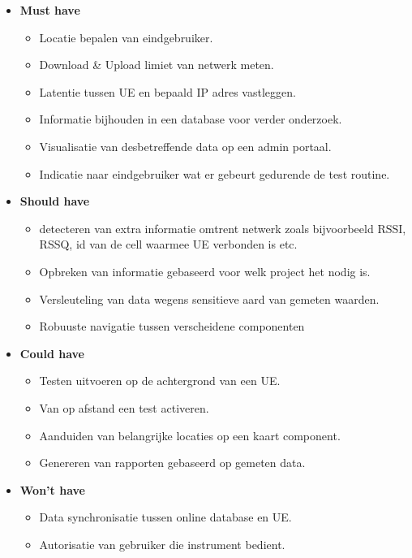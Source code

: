 \begin{itemize}
    \item \textbf{Must have}
    \begin{itemize}
        \item Locatie bepalen van eindgebruiker.
        \item Download \& Upload limiet van netwerk meten.
        \item Latentie tussen UE en bepaald IP adres vastleggen.
        \item Informatie bijhouden in een database voor verder onderzoek.
        \item Visualisatie van desbetreffende data op een admin portaal.
        \item Indicatie naar eindgebruiker wat er gebeurt gedurende de test routine.
    \end{itemize}
    \item \textbf{Should have}
    \begin{itemize}
        \item detecteren van extra informatie omtrent netwerk zoals bijvoorbeeld RSSI, RSSQ, id van de cell waarmee UE verbonden is etc.
        \item Opbreken van informatie gebaseerd voor welk project het nodig is.
        \item Versleuteling van data wegens sensitieve aard van gemeten waarden.
        \item Robuuste navigatie tussen verscheidene componenten
    \end{itemize}
    \item \textbf{Could have}
    \begin{itemize}
        \item Testen uitvoeren op de achtergrond van een UE.
        \item Van op afstand een test activeren.
        \item Aanduiden van belangrijke locaties op een kaart component.
        \item Genereren van rapporten gebaseerd op gemeten data.
    \end{itemize}
    \item \textbf{Won't have}
    \begin{itemize}
        \item Data synchronisatie tussen online database en UE.
        \item Autorisatie van gebruiker die instrument bedient.
    \end{itemize}
\end{itemize}

